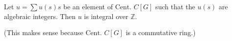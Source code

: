Let $u = \sum u(s)s$ be an element of $\text{Cent. } C[G]$ such that the $u(s)$ are algebraic integers. Then $u$ is integral over $\mathbb{Z}$.

(This makes sense because $\text{Cent. } C[G]$ is a commutative ring.)
